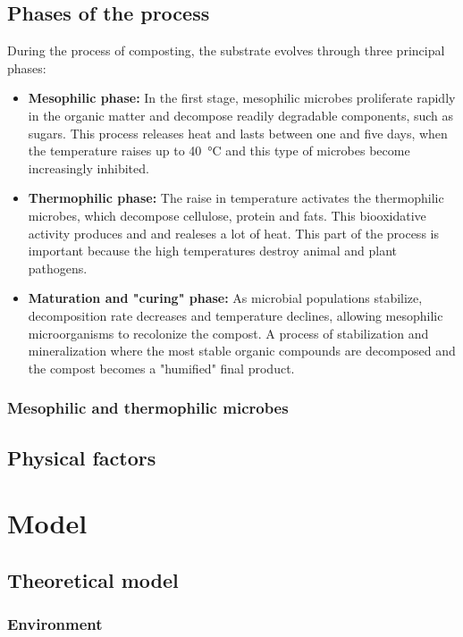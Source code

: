 \documentclass[12pt, a4paper, twocolumn, twoside]{article}
\numberwithin{table}{section}
\numberwithin{figure}{section}
\numberwithin{equation}{section}
\begin{document}
\subsection{Phases of the process}
During the process of composting, the substrate evolves through three principal phases:
\begin{itemize}
	\item \textbf{Mesophilic phase:} In the first stage, mesophilic microbes proliferate rapidly in the organic matter and decompose readily degradable components, such as sugars. This process releases heat and lasts between one and five days, when the temperature raises up to \SI{40}{\celsius} and this type of microbes become increasingly inhibited.
	\item \textbf{Thermophilic phase:} The raise in temperature activates the thermophilic microbes, which decompose cellulose, protein and fats. This biooxidative activity produces  and  and realeses a lot of heat. This part of the process is important because the high temperatures destroy animal and plant pathogens.
	\item \textbf{Maturation and "curing" phase:} As microbial populations stabilize, decomposition rate decreases and temperature declines, allowing mesophilic microorganisms to recolonize the compost. A process of stabilization and mineralization where the most stable organic compounds are decomposed and the compost becomes a "humified" final product.

\end{itemize}

\subsubsection{Mesophilic and thermophilic microbes}
\subsection{Physical factors}


\section{Model}

\subsection{Theoretical model}

\subsubsection{Environment}
\end{document}
